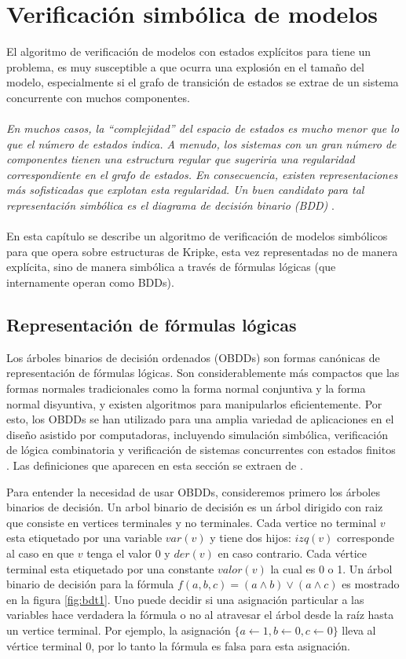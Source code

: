 \chapter{Verificación simbólica de modelos}

El algoritmo de verificación de modelos con estados explícitos para {\mucalculo} tiene un problema, es muy susceptible a que ocurra una explosión en el tamaño del modelo, especialmente si el grafo de transición de estados se extrae de un sistema concurrente con muchos componentes. \\
\\
\textit{En muchos casos, la “complejidad” del espacio de estados es mucho menor que lo que el número de estados indica. A menudo, los sistemas con un gran número de componentes tienen una estructura regular que sugeriria una regularidad correspondiente en el grafo de estados. En consecuencia, existen representaciones más sofisticadas que explotan esta regularidad. Un buen candidato para tal representación simbólica es el diagrama de decisión binario (BDD)} \cite{Burch:4}.\\ 
\\
En esta capítulo se describe un algoritmo de verificación de modelos simbólicos para {\mucalculo} que opera sobre estructuras de Kripke, esta vez representadas no de manera explícita, sino de manera simbólica a través de fórmulas lógicas (que internamente operan como BDDs).

\section{Representación de fórmulas lógicas}

Los árboles binarios de decisión ordenados (OBDDs) son formas canónicas de representación de fórmulas lógicas. Son considerablemente más compactos que las formas normales tradicionales como la forma normal conjuntiva y la forma normal disyuntiva, y existen algoritmos para manipularlos eficientemente. Por esto, los OBDDs se han utilizado para una amplia variedad de aplicaciones en el diseño asistido por computadoras, incluyendo simulación simbólica, verificación de lógica combinatoria y verificación de sistemas concurrentes con estados finitos \cite{Clarke:1}. Las definiciones que aparecen en esta sección se extraen de \cite{Clarke:1}.

\noindent Para entender la necesidad de usar OBDDs, consideremos primero los árboles binarios de decisión. Un arbol binario de decisión es un árbol dirigido con raiz que consiste en vertices terminales y no terminales. Cada vertice no terminal $v$ esta etiquetado por una variable $var(v)$ y tiene dos hijos: $izq(v)$ corresponde al caso en que $v$ tenga el valor 0 y $der(v)$ en caso contrario. Cada vértice terminal esta etiquetado por una constante $valor(v)$ la cual es 0 o 1. Un árbol binario de decisión para la fórmula $f(a,b,c) = (a \land b) \lor (a \land c)$ es mostrado en la figura \ref{fig:bdt1}. Uno puede decidir si una asignación particular a las variables hace verdadera la fórmula o no al atravesar el árbol desde la raíz hasta un vertice terminal. Por ejemplo, la asignación $\{ a \gets 1, b \gets 0, c \gets 0\}$ lleva al vértice terminal 0, por lo tanto la fórmula es falsa para esta asignación.

